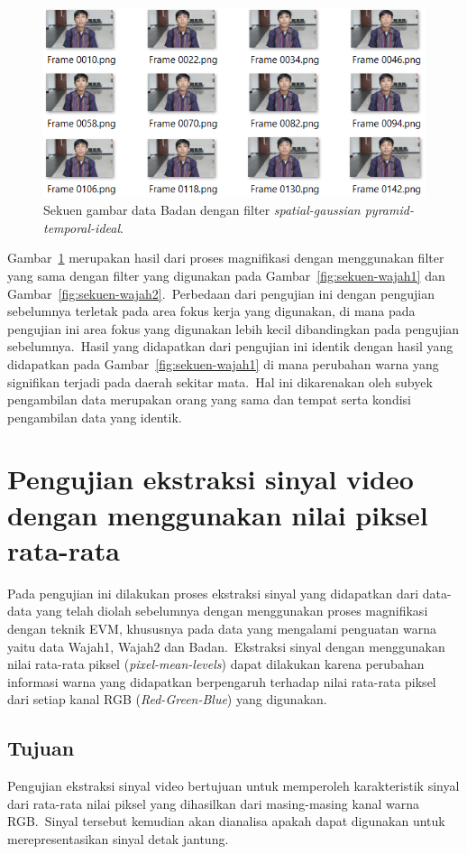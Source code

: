 \begin{figure}[ht]
	\vspace{0.5em}
	\centering
	\includegraphics[width=\textwidth]{data-badan}
	\caption{Sekuen gambar data Badan dengan filter \textit{spatial-gaussian pyramid-temporal-ideal}.}
	\label{fig:sekuen-badan}   
\end{figure}
Gambar~\ref{fig:sekuen-badan} merupakan hasil dari proses magnifikasi dengan menggunakan filter yang sama dengan filter yang digunakan pada Gambar~\ref{fig:sekuen-wajah1} dan Gambar~\ref{fig:sekuen-wajah2}.~Perbedaan dari pengujian ini dengan pengujian sebelumnya terletak pada area fokus kerja yang digunakan, di mana pada pengujian ini area fokus yang digunakan lebih kecil dibandingkan pada pengujian sebelumnya.~Hasil yang didapatkan dari pengujian ini identik dengan hasil yang didapatkan pada Gambar~\ref{fig:sekuen-wajah1} di mana perubahan warna yang signifikan terjadi pada daerah sekitar mata.~Hal ini dikarenakan oleh subyek pengambilan data merupakan orang yang sama dan tempat serta kondisi pengambilan data yang identik.

\newpage
\section{Pengujian ekstraksi sinyal video dengan menggunakan nilai piksel rata-rata}
Pada pengujian ini dilakukan proses ekstraksi sinyal yang didapatkan dari data-data yang telah diolah sebelumnya dengan menggunakan proses magnifikasi dengan teknik EVM, khususnya pada data yang mengalami penguatan warna yaitu data Wajah1, Wajah2 dan Badan.~Ekstraksi sinyal dengan menggunakan nilai rata-rata piksel (\textit{pixel-mean-levels}) dapat dilakukan karena perubahan informasi warna yang didapatkan berpengaruh terhadap nilai rata-rata piksel dari setiap kanal RGB (\textit{Red-Green-Blue}) yang digunakan.
\subsection{Tujuan}
Pengujian ekstraksi sinyal video bertujuan untuk memperoleh karakteristik sinyal dari rata-rata nilai piksel yang dihasilkan dari masing-masing kanal warna RGB.~Sinyal tersebut kemudian akan dianalisa apakah dapat digunakan untuk merepresentasikan sinyal detak jantung.

